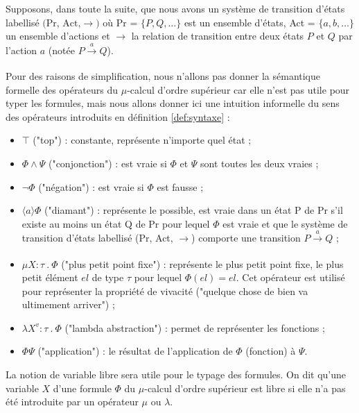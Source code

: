 \documentclass{rapport}
\theoremstyle{plain}
\theoremstyle{remark}
\theoremstyle{definition}
\begin{document}
Supposons, dans toute la suite, que nous avons un système de transition d'états labellisé $\text{(Pr, Act,} \rightarrow)$ où Pr = $\{P, Q, \ldots\}$ est un ensemble d'états, Act = $\{a, b,\ldots\}$ un ensemble d'actions et $\rightarrow$ la relation de transition entre deux états $P$ et $Q$ par l'action $a$ (notée $P\xrightarrow[]{a} Q$).  

Pour des raisons de simplification, nous n'allons pas donner la sémantique formelle des opérateurs du $\mu$-calcul d'ordre supérieur car elle n'est pas utile pour typer les formules, mais nous allons donner ici une intuition informelle du sens des opérateurs introduits en définition \ref{def:syntaxe} :

\begin{itemize}
  \item $\top$ ("top") : constante, représente n'importe quel état ;
  \item $\Phi \wedge \Psi$ ("conjonction") : est vraie si $\Phi$ et $\Psi$ sont toutes les deux vraies ;
  \item $\neg\Phi$ ("négation") : est vraie si $\Phi$ est fausse ;
  \item $\langle a \rangle \Phi$ ("diamant") : représente le possible, est vraie dans un état P de Pr s'il existe au moins un état Q de Pr pour lequel $\Phi$ est vraie et que le système de transition d'états labellisé (Pr, Act, $\rightarrow$) comporte une transition $P\xrightarrow[]{a} Q$ ;
  \item $\mu X : \tau \  . \ \Phi$ ("plus petit point fixe") : représente le plus petit point fixe, le plus petit élément $el$ de type $\tau$ pour lequel $\Phi (el) = el$. Cet opérateur est utilisé pour représenter la propriété de vivacité ("quelque chose de bien va ultimement arriver") ; 
  \item $\lambda X^{v} : \tau \ . \ \Phi$ ("lambda abstraction") : permet de représenter les fonctions ;
  \item $\Phi \Psi$ ("application") : le résultat de l'application de $\Phi$ (fonction) à $\Psi$.
\end{itemize}

La notion de variable libre sera utile pour le typage des formules. On dit qu'une variable $X$ d'une formule $\Phi$ du $\mu$-calcul d'ordre supérieur est libre si elle n'a pas été introduite par un opérateur $\mu$ ou $\lambda$. 
\end{document}
